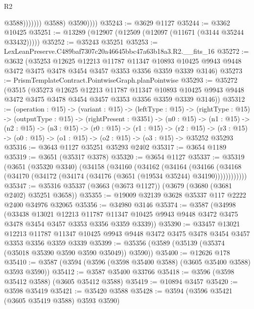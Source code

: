 \begin{lexlean}{R2}
\begin{coremodule}
                            @3588)))))))
              @3588)
            @3590))))
@35243 := @3629 @1127
@35244 := @3362 @10425
@35251 := @13289 (@12907 (@12509 (@12097 (@11671 (@3144 @35244 @33432)))))
@35252 := @35243 @35251
@35253 := LexLeanPreserve.C489baf7307c20a46645bbc47a63b18a3.R2.__fits_16
@35272 := @3632
    (@35253
      @12625
      @12213
      @11787
      @11347
      @10893
      @10425
      @9943
      @9448
      @3472
      @3475
      @3478
      @3454
      @3457
      @3353
      @3356
      @3359
      @3339
      @3146)
@35273 := PrismTemplateContract.PointwiseGraph.planPointwise
@35293 := @35272
    (@3515
      (@35273
        @12625
        @12213
        @11787
        @11347
        @10893
        @10425
        @9943
        @9448
        @3472
        @3475
        @3478
        @3454
        @3457
        @3353
        @3356
        @3359
        @3339
        @3146))
@35312 := (operation : @15) ->
  (variant : @15) ->
  (leftType : @15) ->
  (rightType : @15) ->
  (outputType : @15) ->
  (rightPresent : @3351) ->
  (n0 : @15) ->
  (n1 : @15) ->
  (n2 : @15) ->
  (n3 : @15) ->
  (r0 : @15) ->
  (r1 : @15) ->
  (r2 : @15) -> (r3 : @15) -> (o0 : @15) -> (o1 : @15) -> (o2 : @15) -> (o3 : @15) -> @35252 @35293
@35316 := @3643 @1127 @35251 @35293 @2402
@35317 := @3654 @1189
@35319 := @3651 (@35317 @3378)
@35320 := @3654 @1127
@35337 := @35319
    (@3651
      (@35320 @3340)
      (@34158
        (@34160
          (@34162
            (@34164
              (@34166
                (@34168 (@34170 (@34172 (@34174 (@34176 (@3651 (@19534 @35244) @34190))))))))))))
@35347 := @35316 @35337 (@3663 (@3673 @1127)) (@3679 (@3680 (@3681 @2402) @35251 @3658))
@35355 := @19009 @32139 @3628 @35337 @117 @2222 @2400 @34976 @32065
@35356 := @34980 @3146
@35374 := @3587
    (@34998
      (@33438
        @13021
        @12213
        @11787
        @11347
        @10425
        @9943
        @9448
        @3472
        @3475
        @3478
        @3454
        @3457
        @3353
        @3356
        @3359
        @3339))
@35390 := @33457
    @13021
    @12213
    @11787
    @11347
    @10425
    @9943
    @9448
    @3472
    @3475
    @3478
    @3454
    @3457
    @3353
    @3356
    @3359
    @3339
@35399 := @35356 (@3589 (@35139 (@35374 (@35018 @35390 @3590 @3590 @35049)) @3590))
@35400 := @12626 @178
@35410 := @3587 (@3594 (@3596 (@3598 @35400 @3588) (@3605 @35400 @3588) @3593 @3590))
@35412 := @3587 @35400 @33766
@35418 := @3596 (@3598 @35412 @3588) (@3605 @35412 @3588)
@35419 := @10894 @3457
@35420 := @3598 @35419
@35421 := @35420 @3588
@35428 := @3594 (@3596 @35421 (@3605 @35419 @3588) @3593 @3590)

\end{coremodule}
\end{lexlean}
